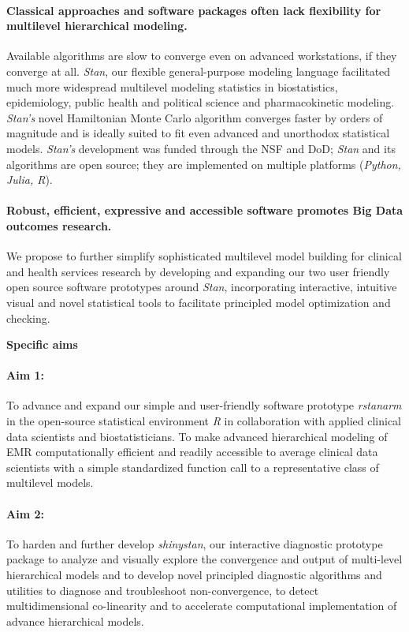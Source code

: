 \documentclass[11pt,notitlepage]{article}
\begin{document}
\paragraph*{Classical approaches and software packages often lack flexibility 
for multilevel hierarchical modeling.} Available algorithms are slow to converge 
even on advanced workstations, if they converge at all. \textit{Stan}, our 
flexible general-purpose modeling language facilitated much more widespread 
multilevel modeling statistics in biostatistics, epidemiology, public health 
and political science and pharmacokinetic modeling. \textit{Stan's} novel 
Hamiltonian Monte Carlo algorithm converges faster by orders of magnitude 
and is ideally suited to fit even advanced and unorthodox statistical 
models. \textit{Stan's} development was funded through the NSF and DoD; 
\textit{Stan} and its algorithms are open source; they are implemented on 
multiple platforms (\textit{Python, Julia, R}). 

\paragraph*{Robust, efficient, expressive and accessible software promotes Big 
Data outcomes research.} We propose to further simplify sophisticated multilevel model 
building for clinical and health services research by developing and expanding 
our two user friendly open source software prototypes around \textit{Stan}, 
incorporating interactive, intuitive visual and novel statistical tools to 
facilitate principled model optimization and checking. 

\noindent \textbf{Specific aims}
\paragraph*{Aim 1:} To advance and expand our simple and user-friendly software 
prototype \textit{rstanarm} in the open-source statistical environment \textit{R} 
in collaboration with applied clinical data scientists and biostatisticians. To 
make advanced hierarchical modeling of EMR computationally efficient and readily 
accessible to average clinical data scientists with a simple standardized function 
call to a representative class of multilevel models.

\paragraph*{Aim 2:} To harden and further develop \textit{shinystan}, our 
interactive diagnostic prototype package to analyze and visually explore 
the convergence and output of multi-level hierarchical models and to develop novel 
principled diagnostic algorithms and utilities to diagnose and troubleshoot 
non-convergence, to detect multidimensional co-linearity and to accelerate 
computational implementation of advance hierarchical models.
\end{document}
